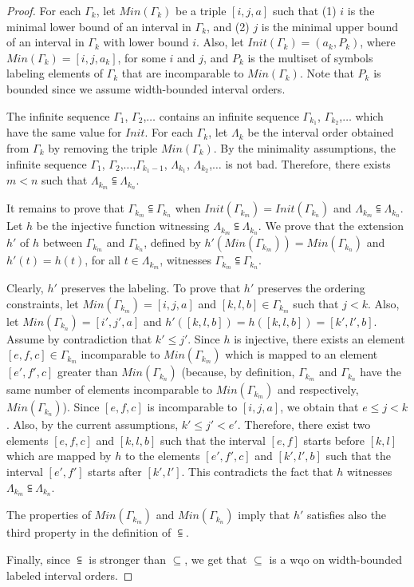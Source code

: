 \begin{proof}
For each $\Gamma_k$, let $Min(\Gamma_k)$ be a triple $[i,j,a]$ such that
(1) $i$ is the minimal lower bound of an interval in $\Gamma_k$, and
(2) $j$ is the minimal upper bound of an interval in $\Gamma_k$ with lower bound $i$.
Also, let $Init(\Gamma_k) = (a_k, P_k)$, where $Min(\Gamma_k)=[i,j,a_k]$, for some $i$ and $j$, and $P_k$ is the multiset of symbols labeling elements of $\Gamma_k$ that are incomparable to $Min(\Gamma_k)$. Note that $P_k$ is bounded since we assume width-bounded interval orders.

The infinite sequence $\Gamma_1$, $\Gamma_2$,$\ldots$ contains an infinite sequence $\Gamma_{k_1}$, $\Gamma_{k_2}$,$\ldots$ which have the same value for $Init$.
For each $\Gamma_k$, let $\Lambda_k$ be the interval order obtained from $\Gamma_k$ by removing the triple $Min(\Gamma_k)$.
By the minimality assumptions, the infinite sequence $\Gamma_1$, $\Gamma_2$,$\ldots$,$\Gamma_{k_1-1}$, $\Lambda_{k_1}$, $\Lambda_{k_2}$,$\ldots$ is not bad.
Therefore, there exists $m<n$ such that $\Lambda_{k_m}\subseteqq \Lambda_{k_n}$.

It remains to prove that $\Gamma_{k_m}\subseteqq \Gamma_{k_n}$ when
$Init(\Gamma_{k_m})=Init(\Gamma_{k_n})$ and $\Lambda_{k_m}\subseteqq
\Lambda_{k_n}$. Let $h$ be the injective function witnessing
$\Lambda_{k_m}\subseteqq \Lambda_{k_n}$. We prove that the extension $h'$ of $h$
between $\Gamma_{k_m}$ and $\Gamma_{k_n}$, defined by
$h'(Min(\Gamma_{k_m}))=Min(\Gamma_{k_n})$ and $h'(t)=h(t)$, for all $t\in
\Lambda_{k_m}$, witnesses $\Gamma_{k_m}\subseteqq \Gamma_{k_n}$.

Clearly, $h'$ preserves the labeling.
To prove that $h'$ preserves the ordering constraints, let $Min(\Gamma_{k_m})=[i,j,a]$ and $[k,l,b]\in \Gamma_{k_m}$ such that $j< k$. Also, let $Min(\Gamma_{k_n})=[i',j',a]$ and $h'([k,l,b])=h([k,l,b])=[k',l',b]$. Assume by contradiction that $k'\leq j'$. Since $h$ is injective, there exists an element $[e,f,c]\in \Gamma_{k_m}$ incomparable to $Min(\Gamma_{k_m})$ which is mapped to an element $[e',f',c]$ greater than $Min(\Gamma_{k_n})$ (because, by definition, $\Gamma_{k_m}$ and $\Gamma_{k_n}$ have the same number of elements incomparable to $Min(\Gamma_{k_m})$ and respectively, $Min(\Gamma_{k_n})$).
Since $[e,f,c]$ is incomparable to $[i,j,a]$, we obtain that $e\leq j< k$. Also, by the current assumptions, $k'\leq j'<e'$. Therefore, there exist two elements $[e,f,c]$ and $[k,l,b]$ such that the interval $[e,f]$ starts before $[k,l]$ which are mapped by $h$ to the elements $[e',f',c]$ and $[k',l',b]$ such that the interval $[e',f']$ starts after $[k',l']$. This contradicts the fact that $h$ witnesses $\Lambda_{k_m}\subseteqq \Lambda_{k_n}$.

The properties of $Min(\Gamma_{k_m})$ and $Min(\Gamma_{k_n})$ imply that $h'$ satisfies also the third property in the definition of $\subseteqq$.

Finally, since $\subseteqq$ is stronger than $\subseteq$, we get that $\subseteq$ is a wqo on width-bounded labeled interval orders.
\end{proof}

